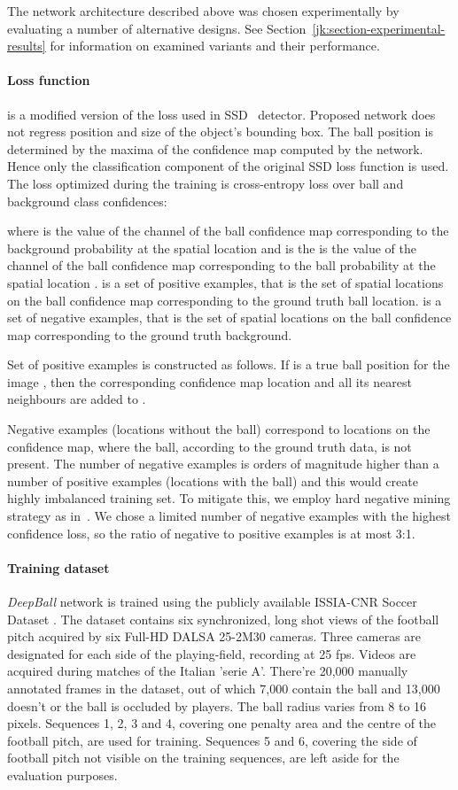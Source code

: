 \documentclass[a4paper,twoside]{article}
\begin{document}
The network architecture described above was chosen experimentally by evaluating a number of alternative designs. See Section~\ref{jk:section-experimental-results} for information on examined variants and their performance.


\paragraph{Loss function} is a modified version of the loss used in SSD~\cite{Liu16} detector. Proposed network does not regress position and size of the object's bounding box. The ball position is determined by the maxima of the confidence map computed by the network. Hence only the classification component of the original SSD loss function is used. The loss  optimized during the training is cross-entropy loss over ball and background class confidences:

where 
 is the value of the channel of the ball confidence map corresponding to the background probability at the spatial location  and  is the is the value of the channel of the ball confidence map corresponding to the ball probability at the spatial location .  is a set of positive examples, that is the set of spatial locations on the ball confidence map corresponding to the ground truth ball location.  is a set of negative examples, that is the set of spatial locations on the ball confidence map corresponding to the ground truth background.

Set of positive examples  is constructed as follows. If  is a true ball position for the image , then the corresponding confidence map location  and all its nearest neighbours are added to .

Negative examples (locations without the ball) correspond to locations on the confidence map, where the ball, according to the ground truth data, is not present.
The number of negative examples is orders of magnitude higher than a number of positive examples (locations with the ball) and this would create highly imbalanced training set.
To mitigate this, we employ hard negative mining strategy as in~\cite{Liu16}. We chose a limited number of negative examples with the highest confidence loss, so the ratio of negative to positive examples is at most 3:1.

\paragraph{Training dataset}
\emph{DeepBall} network is trained using the publicly available ISSIA-CNR Soccer Dataset \cite{DOr09}. The dataset contains six synchronized, long shot views of the football pitch acquired by six Full-HD DALSA 25-2M30 cameras. Three cameras are designated for each side of the playing-field, recording at 25 fps. Videos are acquired during matches of the Italian 'serie A'. There're 20,000 manually annotated frames in the dataset, out of which 7,000 contain the ball and 13,000 doesn't or the ball is occluded by players. The ball radius varies from 8 to 16 pixels. Sequences 1, 2, 3 and 4, covering one penalty area and the centre of the football pitch, are used for training. Sequences 5 and 6, covering the side of football pitch not visible on the training sequences, are left aside for the evaluation purposes.
\end{document}
